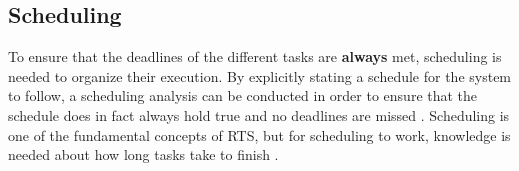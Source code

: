\subsection{Scheduling}
To ensure that the deadlines of the different tasks are \textbf{always} met,
scheduling is needed to organize their execution. By explicitly stating a
schedule for the system to follow, a scheduling analysis can be conducted in
order to ensure that the schedule does in fact always hold true and no deadlines
are missed \Source. Scheduling is one of the fundamental concepts of RTS, but
for scheduling to work, knowledge is needed about how long tasks take to finish
\Source.




